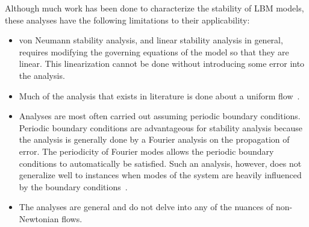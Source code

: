 \documentclass{article}
\begin{document}
Although much work has been done to characterize the stability of LBM models, these analyses have the following limitations to their applicability:
\begin{itemize}
	\item von Neumann stability analysis, and linear stability analysis in general, requires modifying the governing equations of the model so that they are linear. 
	This linearization cannot be done without introducing some error into the analysis. %
	\item Much of the analysis that exists in literature is done about a uniform flow~\cite{worthing1997stability,niu2004investigation}. %
	\item Analyses are most often carried out assuming periodic boundary conditions.
	Periodic boundary conditions are advantageous for stability analysis because the analysis is generally done by a Fourier analysis on the propagation of error.
	The periodicity of Fourier modes allows the periodic boundary conditions to automatically be satisfied.
	Such an analysis, however, does not generalize well to instances when modes of the system are heavily influenced by the boundary conditions~\cite{worthing1997stability}.
	\item The analyses are general and do not delve into any of the nuances of non-Newtonian flows.
\end{itemize}
\end{document}
